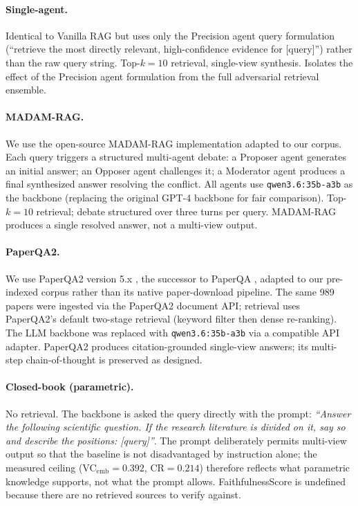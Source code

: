 \documentclass[11pt]{article}
\begin{document}
\paragraph{Single-agent.}
Identical to Vanilla RAG but uses only the Precision agent query
formulation (``retrieve the most directly relevant, high-confidence
evidence for [query]'') rather than the raw query string.  Top-$k{=}10$
retrieval, single-view synthesis.  Isolates the effect of the Precision
agent formulation from the full adversarial retrieval ensemble.

\paragraph{MADAM-RAG.}
We use the open-source MADAM-RAG implementation \citep{wang2025conflicting}
adapted to our corpus.  Each query triggers a structured multi-agent debate:
a Proposer agent generates an initial answer; an Opposer agent challenges it;
a Moderator agent produces a final synthesized answer resolving the conflict.
All agents use \texttt{qwen3.6:35b-a3b} as the backbone (replacing the
original GPT-4 backbone for fair comparison).  Top-$k{=}10$ retrieval;
debate structured over three turns per query.  MADAM-RAG produces a
single resolved answer, not a multi-view output.

\paragraph{PaperQA2.}
We use PaperQA2 version 5.x \citep{skarlinski2024paperqa2}, the successor to
PaperQA \citep{lala2023paperqa}, adapted to our
pre-indexed corpus rather than its native paper-download pipeline.
The same 989 papers were ingested via the PaperQA2 document API;
retrieval uses PaperQA2's default two-stage retrieval (keyword filter
then dense re-ranking).  The LLM backbone was replaced with
\texttt{qwen3.6:35b-a3b} via a compatible API adapter.  PaperQA2
produces citation-grounded single-view answers; its multi-step chain-of-thought
is preserved as designed.

\paragraph{Closed-book (parametric).}
No retrieval.  The backbone is asked the query directly with the prompt:
\textit{``Answer the following scientific question. If the research literature
is divided on it, say so and describe the positions: [query]''}.  The prompt
deliberately permits multi-view output so that the baseline is not
disadvantaged by instruction alone; the measured ceiling
(VC$_\text{emb}{=}0.392$, CR$=0.214$) therefore reflects what parametric
knowledge supports, not what the prompt allows.  FaithfulnessScore is undefined
because there are no retrieved sources to verify against.
\end{document}
